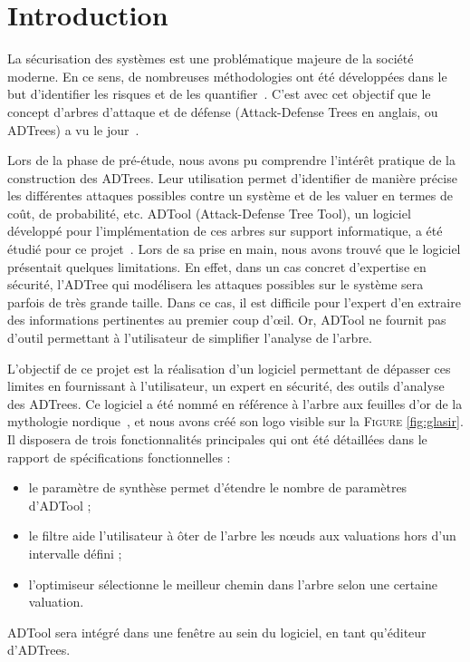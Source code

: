 \section{Introduction}
    \label{sec:intro}

    La sécurisation des systèmes est une problématique majeure de la société moderne. En ce sens, de nombreuses méthodologies ont été développées dans le but d'identifier les risques et de les quantifier~\cite{survey}. C'est avec cet objectif que le concept d'arbres d'attaque et de défense (\og Attack-Defense Trees \fg{} en anglais, ou ADTrees) a vu le jour~\cite{JLC}.

    Lors de la phase de pré-étude, nous avons pu comprendre l’intérêt pratique de la construction des ADTrees. Leur utilisation permet d'identifier de manière précise les différentes attaques possibles contre un système et de les valuer en termes de coût, de probabilité, etc. ADTool (Attack-Defense Tree Tool), un logiciel développé pour l'implémentation de ces arbres sur support informatique, a été étudié pour ce projet~\cite{ADTool}. Lors de sa prise en main, nous avons trouvé que le logiciel présentait quelques limitations. En effet, dans un cas concret d'expertise en sécurité, l'ADTree qui modélisera les attaques possibles sur le système sera parfois de très grande taille. Dans ce cas, il est difficile pour l'expert d'en extraire des informations pertinentes au premier coup d’œil. Or, ADTool ne fournit pas d'outil permettant à l'utilisateur de simplifier l'analyse de l'arbre. 

    L'objectif de ce projet est la réalisation d'un logiciel permettant de dépasser ces limites en fournissant à l'utilisateur, un expert en sécurité, des outils d'analyse des ADTrees. Ce logiciel a été nommé \glasir{} en référence à l'arbre aux feuilles d'or de la mythologie nordique~\cite{vikingCulture}, et nous avons créé son logo visible sur la \textsc{Figure} \ref{fig:glasir}. Il disposera de trois fonctionnalités principales qui ont été détaillées dans le rapport de spécifications fonctionnelles :
    \begin{itemize}
    	\item le paramètre de synthèse permet d'étendre le nombre de paramètres d'ADTool ;
    	\item le filtre aide l'utilisateur à ôter de l’arbre les nœuds aux valuations hors d'un intervalle défini ;
    	\item l'optimiseur sélectionne le meilleur chemin dans l'arbre selon une certaine valuation.
    \end{itemize}
    ADTool sera intégré dans une fenêtre au sein du logiciel, en tant qu'éditeur d'ADTrees. 

